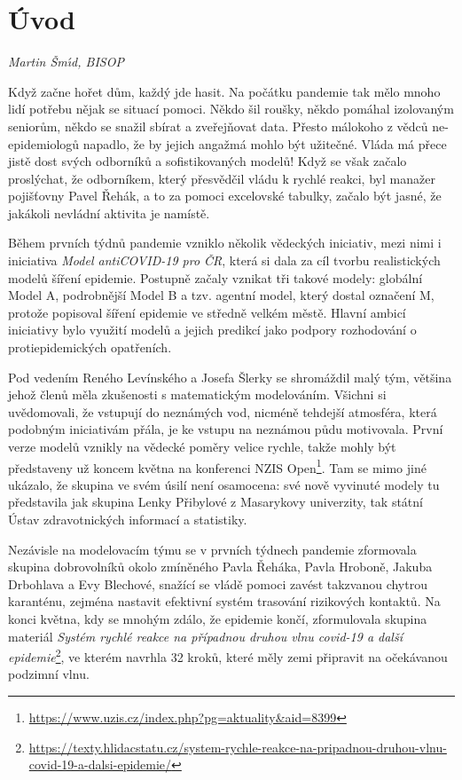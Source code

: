 \chapter*{Úvod}

\textit{Martin \v Sm\'\i d, BISOP}
\vspace{15mm}

Když začne hořet dům, každý jde hasit. Na počátku pandemie tak mělo mnoho lidí potřebu nějak se situací pomoci. Někdo šil roušky, někdo pomáhal izolovaným seniorům, někdo se snažil sbírat a zveřejňovat data. Přesto málokoho z vědců ne-epidemiologů napadlo, že by jejich angažmá mohlo být užitečné. Vláda má přece jistě dost svých odborníků a sofistikovaných modelů! Když se však začalo proslýchat, že odborníkem, který přesvědčil vládu k rychlé reakci, byl manažer pojišťovny Pavel Řehák, a to za pomoci excelovské tabulky, začalo být jasné, že jakákoli nevládní aktivita je namístě.

Během prvních týdnů pandemie vzniklo několik vědeckých iniciativ, mezi nimi i iniciativa {\em Model antiCOVID-19 pro ČR}, která si dala za cíl tvorbu realistických modelů šíření epidemie. Postupně začaly vznikat tři takové modely: globální Model A, podrobnější Model B a tzv. agentní model, který dostal označení M, protože popisoval šíření epidemie ve středně velkém městě. Hlavní ambicí iniciativy bylo využití modelů a jejich predikcí jako podpory rozhodování o protiepidemických opatřeních. 

Pod vedením Reného Levínského a Josefa Šlerky se shromáždil malý tým, většina jehož členů měla zkušenosti s matematickým modelováním. Všichni si uvědomovali, že vstupují do neznámých vod, nicméně tehdejší atmosféra, která podobným iniciativám přála, je ke vstupu na neznámou půdu motivovala. První verze modelů vznikly na vědecké poměry velice rychle, takže mohly být představeny už koncem května na konferenci NZIS Open\footnote{\url{https://www.uzis.cz/index.php?pg=aktuality&aid=8399}}. Tam se mimo jiné ukázalo, že skupina ve svém úsilí není osamocena: své nově vyvinuté modely tu představila jak skupina Lenky Přibylové z Masarykovy univerzity, tak státní Ústav zdravotnických informací a statistiky. 

Nezávisle na modelovacím týmu se v prvních týdnech pandemie zformovala skupina dobrovolníků okolo zmíněného Pavla Řeháka, Pavla Hroboně, Jakuba Drbohlava a Evy Blechové, snažící se vládě pomoci zavést takzvanou chytrou karanténu, zejména nastavit efektivní systém trasování rizikových kontaktů. Na konci května, kdy se mnohým zdálo, že epidemie končí, zformulovala skupina materiál {\em Systém rychlé reakce na případnou druhou vlnu covid-19 a další epidemie}\footnote{\url{https://texty.hlidacstatu.cz/system-rychle-reakce-na-pripadnou-druhou-vlnu-covid-19-a-dalsi-epidemie/}}, ve kterém navrhla 32 kroků, které měly zemi připravit na očekávanou podzimní vlnu. 


